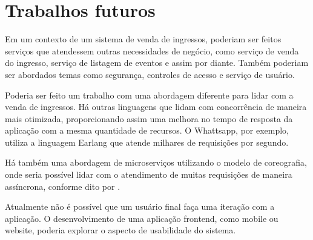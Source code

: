 
\chapter*[Trabalhos futuros]{Trabalhos futuros}\label{trabalhos-futuros}



Em um contexto de um sistema de venda de ingressos, poderiam ser feitos serviços que atendessem
outras necessidades de negócio, como serviço de venda do ingresso, serviço de listagem de eventos
e assim por diante.
Também poderiam ser abordados temas como segurança, controles de acesso e serviço de usuário.

Poderia ser feito um trabalho com uma abordagem diferente para lidar com a venda de ingressos.
Há outras linguagens que lidam com concorrência de maneira mais otimizada,
proporcionando assim uma melhora no tempo de resposta da aplicação com a mesma quantidade
de recursos.
O Whattsapp, por exemplo, utiliza a linguagem Earlang  que
atende milhares de requisições por segundo.

Há também uma abordagem de microserviços utilizando o modelo de coreografia, onde seria possível
lidar com o atendimento de muitas requisições de maneira assíncrona, conforme dito por
\cite{scaling-microservices-event-stream}.

Atualmente não é possível que um usuário final faça uma iteração com a aplicação. O desenvolvimento
de uma aplicação frontend, como mobile ou website, poderia explorar o aspecto de usabilidade
do sistema.
